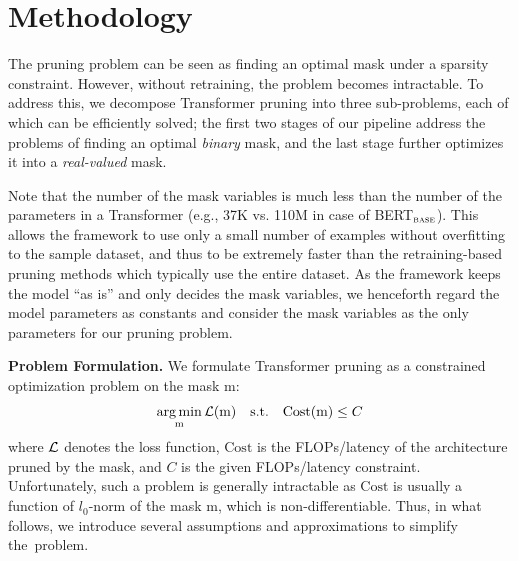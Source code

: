 \section{Methodology}
\label{sec:methodology}

The pruning problem can be seen as finding an optimal mask under a sparsity constraint.
However, without retraining, the problem becomes intractable.
To address this, we decompose Transformer pruning into three sub-problems, each of which can be efficiently solved; the first two stages of our pipeline address the problems of finding an optimal \textit{binary} mask, and the last stage further optimizes it into a \textit{real-valued} mask.

Note that the number of the mask variables is much less than the number of the parameters in a Transformer (e.g., 37K vs. 110M in case of BERT$_\textsc{base}$).
This allows the framework to use only a small number of examples without overfitting to the sample dataset, and thus to be extremely faster than the retraining-based pruning methods which typically use the entire dataset.
As the framework keeps the model ``as is'' and only decides the mask variables, we henceforth regard the model parameters as constants and consider the mask variables as the only parameters for our pruning problem.

\textbf{Problem Formulation.}
We formulate Transformer pruning as a constrained optimization problem on the mask $\text{m}$:
\begin{align}
    \operatorname*{arg\,min}_{\text{m}} {\mathcal{L}}(\text{m}) \label{eq:original_objective} \quad \text{s.t.} \quad \text{Cost}(\text{m}) \leq C
\end{align}
where ${\mathcal{L}}$ denotes the loss function, $\text{Cost}$ is the FLOPs/latency of the architecture pruned by the mask, and $C$ is the given FLOPs/latency constraint.
Unfortunately, such a problem is generally intractable as $\text{Cost}$ is usually a function of $l_0$-norm of the mask $\text{m}$, which is non-differentiable.
Thus, in what follows, we introduce several assumptions and approximations to simplify the~problem.

